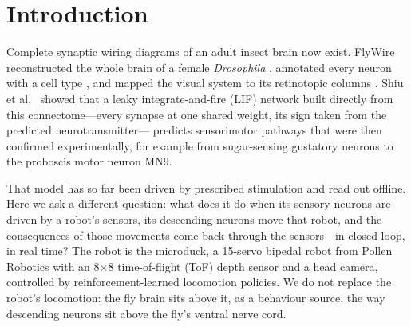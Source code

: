 \documentclass[10pt,a4paper]{article}
\begin{document}
\begin{abstract}
a readout, a correction and control rules of ours, listed. The brain can
also drive the robot from a laptop over WebRTC, with every camera frame dated on the robot's clock. To run the model in closed loop we reimplemented it as a stepped
simulator that reproduces the reference Brian2 implementation spike for spike and runs faster than real
time on one CPU core, using an exact closed-form bound that lets neurons unable to fire before their next
input remain unsimulated. We report what the connectome contributes, what our hand-written sensory and
motor interfaces contribute, and several failure modes found on the way: a dropped-input rule of the
reference model, scrambled retinotopy destroying LPLC2 selectivity, the robot's own gait dominating its
optic flow, and a field of view too narrow for the canonical steering neuron DNa02. Code, experiments and
a recorded demonstration are open source.
\end{abstract}

\section{Introduction}

Complete synaptic wiring diagrams of an adult insect brain now exist. FlyWire reconstructed the whole
brain of a female \emph{Drosophila} \cite{dorkenwald2024}, annotated every neuron with a cell type
\cite{schlegel2024}, and mapped the visual system to its retinotopic columns \cite{matsliah2024}. Shiu et
al.\ \cite{shiu2024} showed that a leaky integrate-and-fire (LIF) network built directly from this
connectome---every synapse at one shared weight, its sign taken from the predicted neurotransmitter---
predicts sensorimotor pathways that were then confirmed experimentally, for example from sugar-sensing
gustatory neurons to the proboscis motor neuron MN9.

That model has so far been driven by prescribed stimulation and read out offline. Here we ask a
different question: what does it do when its sensory neurons are driven by a robot's sensors, its
descending neurons move that robot, and the consequences of those movements come back through the
sensors---in closed loop, in real time? The robot is the microduck, a 15-servo bipedal robot from Pollen
Robotics with an 8$\times$8 time-of-flight (ToF) depth sensor and a head camera, controlled by
reinforcement-learned locomotion policies. We do not replace the robot's locomotion: the fly brain sits
above it, as a behaviour source, the way descending neurons sit above the fly's ventral nerve cord.
\end{document}

